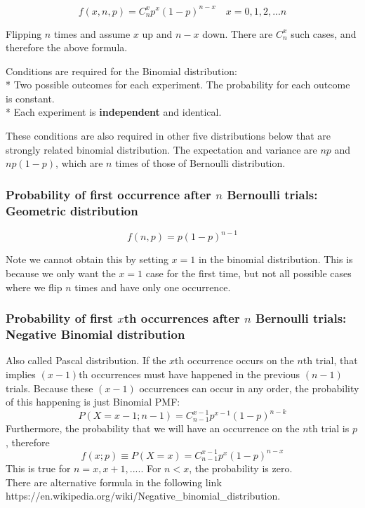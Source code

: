 \documentclass[11pt]{article}
\begin{document}
\[f(x,n,p) = C_n^x p^x(1-p)^{n-x} \quad x = 0, 1, 2,...n \]

Flipping \(n\) times and assume \(x\) up and \(n-x\) down. There are
\(C_n^x\) such cases, and therefore the above formula.

Conditions are required for the Binomial distribution:\\
* Two possible outcomes for each experiment. The probability for each
outcome is constant.\\
* Each experiment is \textbf{independent} and identical.

These conditions are also required in other five distributions below
that are strongly related binomial distribution. The expectation and
variance are \(np\) and \(np(1-p)\), which are \(n\) times of those of
Bernoulli distribution.

\subsubsection{\texorpdfstring{Probability of first occurrence after
\(n\) Bernoulli trials: Geometric
distribution}{Probability of first occurrence after n Bernoulli trials: Geometric distribution}}\label{probability-of-first-occurrence-after-n-bernoulli-trials-geometric-distribution}

\[f(n,p) = p(1-p)^{n-1} \]

Note we cannot obtain this by setting \(x = 1\) in the binomial
distribution. This is because we only want the \(x=1\) case for the
first time, but not all possible cases where we flip \(n\) times and
have only one occurrence.

\subsubsection{\texorpdfstring{Probability of first \(x\)th occurrences
after \(n\) Bernoulli trials: Negative Binomial
distribution}{Probability of first xth occurrences after n Bernoulli trials: Negative Binomial distribution}}\label{probability-of-first-xth-occurrences-after-n-bernoulli-trials-negative-binomial-distribution}

Also called Pascal distribution. If the \(x\)th occurrence occurs on the
\(n\)th trial, that implies \((x-1)\)th occurrences must have happened
in the previous \((n-1)\) trials. Because these \((x-1)\) occurrences
can occur in any order, the probability of this happening is just
Binomial PMF:\\
\[P(X=x-1; n-1) = C_{n-1}^{x-1}p^{x-1}(1-p)^{n-k}\] Furthermore, the
probability that we will have an occurrence on the \(n\)th trial is
\(p\), therefore \[f(x;p) \equiv P(X=x) = C_{n-1}^{x-1}p^x(1-p)^{n-x}\]
This is true for \(n = x, x+1,....\). For \(n<x\), the probability is
zero.\\
There are alternative formula in the following link
https://en.wikipedia.org/wiki/Negative\_binomial\_distribution.
\end{document}
